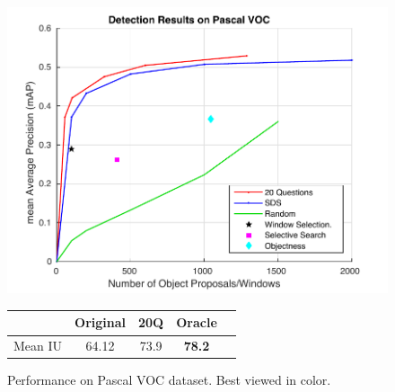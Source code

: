 \begin{figure}
\begin{minipage}{0.5\textwidth}
\includegraphics[width=1\linewidth]{figures/numprop.pdf}
\caption{Performance on Pascal VOC dataset. Best viewed in color. }
\label{fig:mapVSnumprop}
\end{minipage}
\hfill
\begin{minipage}{0.4\textwidth}
\begin{tabular}{|c|c|c|c|c|}                    
\hline                                          
 & Original & 20Q  & Oracle \\          
\hline                                          
 Mean IU & 64.12 &  73.9 &  \textbf{78.2} \\        
\hline                                          
\end{tabular}     
\label{tab:space}                      
\end{minipage}
\end{figure}

